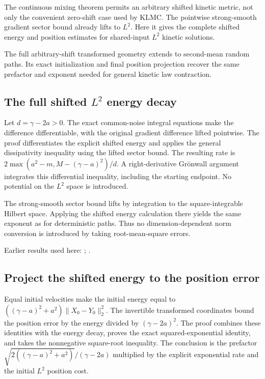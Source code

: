 \documentclass[11pt,a4paper]{report}
\begin{document}
The continuous mixing theorem permits an arbitrary shifted kinetic metric, not only the convenient zero-shift case used by KLMC. The pointwise strong-smooth gradient sector bound already lifts to \(L^{2}\). Here it gives the complete shifted energy and position estimates for shared-input \(L^{2}\) kinetic solutions.



The full arbitrary-shift transformed geometry extends to second-mean random paths. Its exact initialization and final position projection recover the same prefactor and exponent needed for general kinetic law contraction.

\subsection{\texorpdfstring{The full shifted \(L^{2}\) energy decay}{The full shifted L² energy decay}}
\label{report-step-KineticLangevin-LpGeneralContraction-lean-1}


Let \(d=\gamma-2a>0\). The exact common-noise integral equations make the difference differentiable, with the original gradient difference lifted pointwise. The proof differentiates the explicit shifted energy and applies the general dissipativity inequality using the lifted sector bound. The resulting rate is \(2\max(a^2-m,M-(\gamma-a)^2)/d\). A right-derivative Grönwall argument integrates this differential inequality, including the starting endpoint. No potential on the \(L^{2}\) space is introduced.



The strong-smooth sector bound lifts by integration to the square-integrable Hilbert space. Applying the shifted energy calculation there yields the same exponent as for deterministic paths. Thus no dimension-dependent norm conversion is introduced by taking root-mean-square errors.



Earlier results used here: \cite[Section~3.13.2]{LangevinLean2026ULASC}; \cite[Section~3.13.5]{LangevinLean2026ULASC}.
\subsection{\texorpdfstring{Project the shifted energy to the position error}{Project the shifted energy to the position error}}
\label{report-step-KineticLangevin-LpGeneralContraction-lean-2}


Equal initial velocities make the initial energy equal to \(((\gamma-a)^2+a^2)\|X_0-Y_0\|_2^2\). The invertible transformed coordinates bound the position error by the energy divided by \((\gamma-2a)^2\). The proof combines these identities with the energy decay, proves the exact squared-exponential identity, and takes the nonnegative square-root inequality. The conclusion is the prefactor \(\sqrt{2((\gamma-a)^2+a^2)}/(\gamma-2a)\) multiplied by the explicit exponential rate and the initial \(L^{2}\) position cost.
\end{document}
